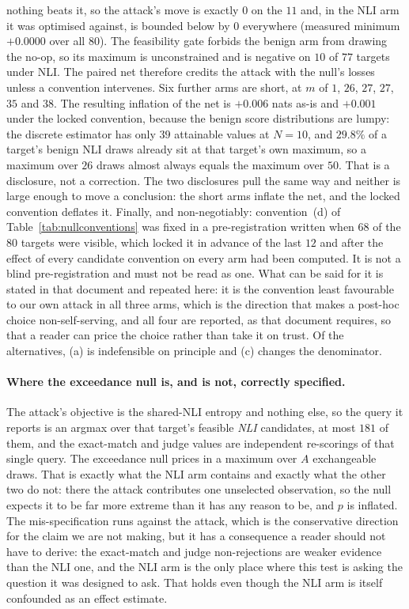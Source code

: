 nothing beats it, so the attack's move is exactly $0$ on the $11$ and, in the NLI arm it was
optimised against, is bounded below by $0$ everywhere (measured minimum $+0.0000$ over all
$80$). The feasibility gate forbids the benign arm from drawing the no-op, so its maximum is
unconstrained and is negative on $10$ of $77$ targets under NLI. The paired net therefore
credits the attack with the null's losses unless a convention intervenes.
Six further arms are
short, at $m$ of $1$, $26$, $27$, $27$, $35$ and $38$. The resulting inflation of the
net is $+0.006$ nats as-is and $+0.001$ under the locked convention, because the benign score
distributions are lumpy: the discrete estimator has only $39$ attainable values at $N{=}10$,
and $29.8\%$ of a target's benign NLI draws already sit at that target's own maximum, so a maximum over
$26$ draws almost always equals the maximum over $50$. That is a disclosure, not a correction.
The two disclosures pull the same way and neither is large enough to move a conclusion: the
short arms inflate the net, and the locked convention deflates it. Finally, and non-negotiably:
convention~(d) of Table~\ref{tab:nullconventions} was fixed in a pre-registration written when
$68$ of the $80$ targets were visible, which locked it in advance of the last $12$ and after
the effect of every candidate convention on
every arm had been computed. It is not a blind pre-registration and must not be read as one.
What can be said for it is stated in that document and repeated here: it is the convention least
favourable to our own attack in all three arms, which is the direction that makes a post-hoc
choice non-self-serving, and all four are reported, as that document requires, so that a reader
can price the choice rather than take it on trust. Of the alternatives, (a) is indefensible on
principle and (c) changes the denominator.

\paragraph{Where the exceedance null is, and is not, correctly specified.}
The attack's objective is the shared-NLI entropy and nothing else, so the query it reports is an
argmax over that target's feasible \emph{NLI} candidates, at most $181$ of them, and the
exact-match and judge values are
independent re-scorings of that single query. The exceedance null prices in a maximum over $A$
exchangeable draws. That is exactly what the NLI arm contains and exactly what the other two do
not: there the attack contributes one unselected observation, so the null expects it to be far
more extreme than it has any reason to be, and $p$ is inflated. The mis-specification runs
against the attack, which is the conservative direction for the claim we are not making, but it
has a consequence a reader should not have to derive: the exact-match and judge non-rejections
are weaker evidence than the NLI one, and the NLI arm is the only place where this test is
asking the question it was designed to ask. That holds even though the NLI arm is itself
confounded as an effect estimate.

